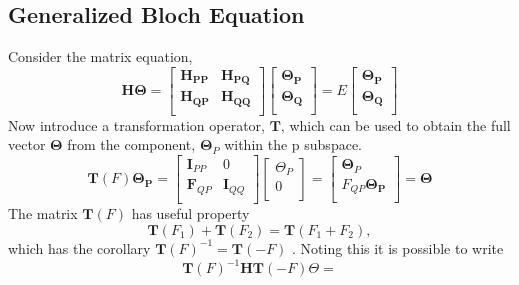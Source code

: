 \documentclass[12pt]{article}
\begin{document}
\subsection{ Generalized Bloch Equation } 
Consider the matrix equation,
\begin{equation}
\mathbf{H}\boldsymbol{\Theta} =
\begin{bmatrix}
 \mathbf{H_{PP}} & \mathbf{H_{PQ}} \\ 
 \mathbf{H_{QP}} & \mathbf{H_{QQ}} \\ 
\end{bmatrix} 
\begin{bmatrix}
 \boldsymbol{\Theta_{P}} \\ 
 \boldsymbol{\Theta_{Q}} \\ 
\end{bmatrix} 
= E 
\begin{bmatrix}
 \boldsymbol{\Theta_{P}} \\ 
 \boldsymbol{\Theta_{Q}} \\ 
\end{bmatrix} 
\end{equation}
Now introduce a transformation operator, $\mathbf{T}$, which can be used to obtain the full 
vector $\boldsymbol{\Theta}$ from the component, $\boldsymbol{\Theta}_{P}$ within the $\mathrm{p}$ subspace.
\begin{equation}
\mathbf{T}(F)\boldsymbol{\Theta_{P}}= 
\begin{bmatrix}
\mathbf{I}_{PP} & 0 \\ 
\mathbf{F}_{QP} & \mathbf{I}_{QQ} \\ 
\end{bmatrix}
\begin{bmatrix}
\Theta_{P} \\ 
0 \\ 
\end{bmatrix}=  
\begin{bmatrix}
\boldsymbol{\Theta}_{P} \\ 
F_{QP}\boldsymbol{\Theta_{P}} \\ 
\end{bmatrix} 
= \boldsymbol{\Theta}
\end{equation}
The matrix $\mathbf{T}(F)$ has useful property
\begin{equation}
\mathbf{T}(F_{1})+ \mathbf{T}(F_{2})=\mathbf{T}(F_{1}+F_{2}),
\end{equation}
which has the corollary  $\mathbf{T}(F)^{-1}=\mathbf{T}(-F)$ . Noting this it is possible to write
\begin{equation}
\mathbf{T}(F)^{-1} \mathbf{H} \mathbf{T}(-F)
\Theta = 
\end{equation}
\end{document}
